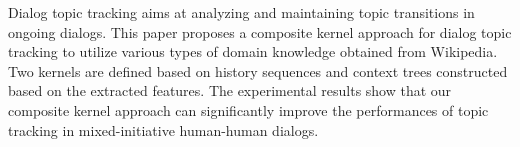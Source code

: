Dialog topic tracking aims at analyzing and maintaining topic transitions in ongoing dialogs. This paper proposes a composite kernel approach for dialog topic tracking to utilize various types of domain knowledge obtained from Wikipedia. Two kernels are defined based on history sequences and context trees constructed based on the extracted features. The experimental results show that our composite kernel approach can significantly improve the performances of topic tracking in mixed-initiative human-human dialogs.
